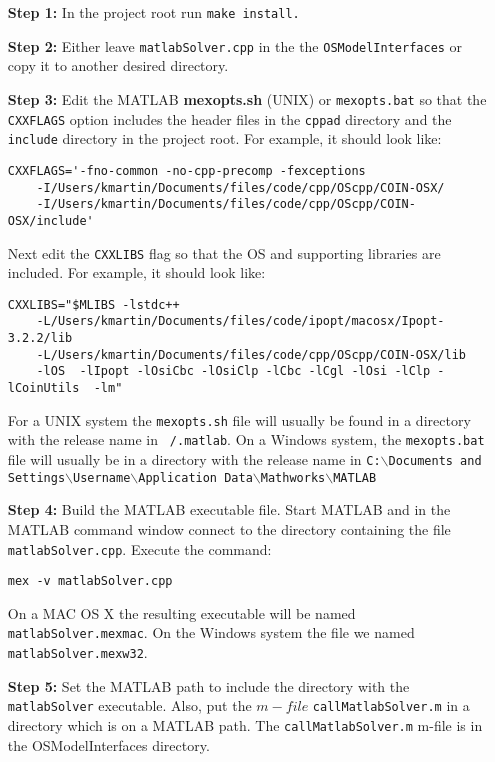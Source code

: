 \documentclass[11pt]{article}
\renewcommand{\_}{{\char"5F}}
\renewcommand{\{}{{\char"7B}}
\renewcommand{\}}{{\char"7D}}
\renewcommand{\^}{{\char"0D}}
\renewcommand{\'}{{\char"0D}}
\begin{document}
\begin{itemize}


\item[{\bf Step  1:}] In the project root run {\tt make install.}

\item[{\bf Step  2:}]   Either leave {\tt matlabSolver.cpp} in the  the {\tt OSModelInterfaces} or copy it to another desired directory.

\item[{\bf Step 3:}] Edit the MATLAB  {\bf mexopts.sh} (UNIX) or {\tt mexopts.bat}  so that the {\tt CXXFLAGS} option includes the header files in the {\tt cppad} directory and the {\tt include} directory in the project root. For example, it  should look like:
\begin{verbatim}
CXXFLAGS='-fno-common -no-cpp-precomp -fexceptions
    -I/Users/kmartin/Documents/files/code/cpp/OScpp/COIN-OSX/   
    -I/Users/kmartin/Documents/files/code/cpp/OScpp/COIN-OSX/include'
\end{verbatim}

Next edit the {\tt CXXLIBS} flag so that the OS and supporting libraries are included. For example, it should look like:

\begin{verbatim}
CXXLIBS="$MLIBS -lstdc++     
    -L/Users/kmartin/Documents/files/code/ipopt/macosx/Ipopt-3.2.2/lib   
    -L/Users/kmartin/Documents/files/code/cpp/OScpp/COIN-OSX/lib     
    -lOS  -lIpopt -lOsiCbc -lOsiClp -lCbc -lCgl -lOsi -lClp -lCoinUtils  -lm"
\end{verbatim}

For a UNIX system the {\tt mexopts.sh} file will usually be found in a directory with the release name in {\tt  ~/.matlab}. On a Windows system, the {\tt  mexopts.bat} file will usually be in a directory with the release name in {\tt C:$\backslash$Documents and Settings$\backslash$Username$\backslash$Application Data$\backslash$Mathworks$\backslash$MATLAB}


\item[{\bf Step 4:}]  Build the MATLAB executable file. Start MATLAB and in the MATLAB command window connect to the directory containing the file {\tt matlabSolver.cpp}.  Execute the command:

\begin{verbatim}
mex -v matlabSolver.cpp
\end{verbatim}

On a MAC OS X the resulting executable will be named {\tt matlabSolver.mexmac}. On the Windows system the file we named {\tt matlabSolver.mexw32}.

\item[{\bf Step 5:}]  Set the MATLAB path to include the directory with the {\tt matlabSolver} executable. Also, put  the $m-file$ {\tt callMatlabSolver.m} in a directory which is on a MATLAB path.  The  {\tt callMatlabSolver.m} m-file is in the OSModelInterfaces directory. 

\end{itemize}
\end{document}
